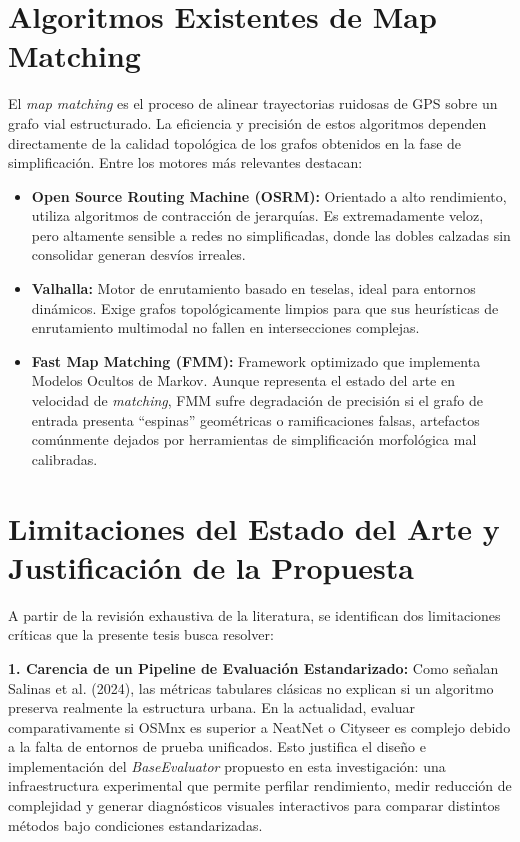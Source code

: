 \section{Algoritmos Existentes de Map Matching}

El \textit{map matching} es el proceso de alinear trayectorias ruidosas de GPS sobre un grafo vial estructurado. La eficiencia y precisión de estos algoritmos dependen directamente de la calidad topológica de los grafos obtenidos en la fase de simplificación. Entre los motores más relevantes destacan:

\begin{itemize}
    \item \textbf{Open Source Routing Machine (OSRM):} Orientado a alto rendimiento, utiliza algoritmos de contracción de jerarquías. Es extremadamente veloz, pero altamente sensible a redes no simplificadas, donde las dobles calzadas sin consolidar generan desvíos irreales.
    
    \item \textbf{Valhalla:} Motor de enrutamiento basado en teselas, ideal para entornos dinámicos. Exige grafos topológicamente limpios para que sus heurísticas de enrutamiento multimodal no fallen en intersecciones complejas.
    
    \item \textbf{Fast Map Matching (FMM):} Framework optimizado que implementa Modelos Ocultos de Markov. Aunque representa el estado del arte en velocidad de \textit{matching}, FMM sufre degradación de precisión si el grafo de entrada presenta ``espinas'' geométricas o ramificaciones falsas, artefactos comúnmente dejados por herramientas de simplificación morfológica mal calibradas.
\end{itemize}

\section{Limitaciones del Estado del Arte y Justificación de la Propuesta}
A partir de la revisión exhaustiva de la literatura, se identifican dos limitaciones críticas que la presente tesis busca resolver:

\textbf{1. Carencia de un Pipeline de Evaluación Estandarizado:}
Como señalan Salinas et al. (2024), las métricas tabulares clásicas no explican si un algoritmo preserva realmente la estructura urbana. En la actualidad, evaluar comparativamente si OSMnx es superior a NeatNet o Cityseer es complejo debido a la falta de entornos de prueba unificados. Esto justifica el diseño e implementación del \textit{BaseEvaluator} propuesto en esta investigación: una infraestructura experimental que permite perfilar rendimiento, medir reducción de complejidad y generar diagnósticos visuales interactivos para comparar distintos métodos bajo condiciones estandarizadas.

